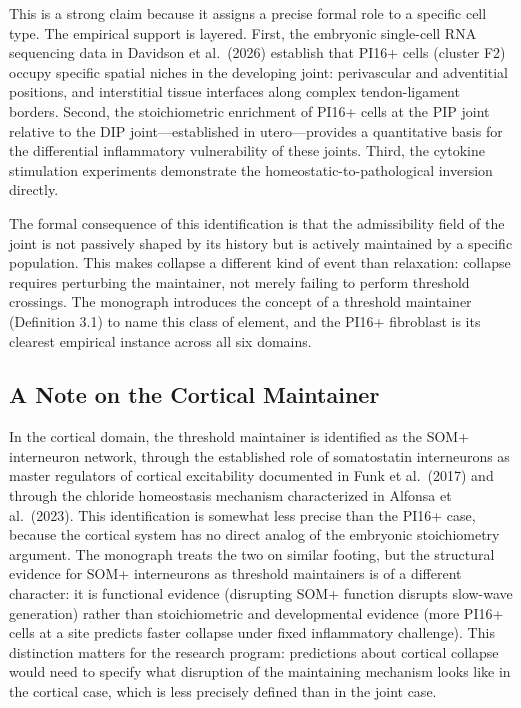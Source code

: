 \documentclass[12pt, a4paper]{article}
\theoremstyle{definition}
\begin{document}
This is a strong claim because it assigns a precise formal role to a specific cell type. The empirical support is layered. First, the embryonic single-cell RNA sequencing data in Davidson et al.\ (2026) establish that PI16+ cells (cluster F2) occupy specific spatial niches in the developing joint: perivascular and adventitial positions, and interstitial tissue interfaces along complex tendon-ligament borders. Second, the stoichiometric enrichment of PI16+ cells at the PIP joint relative to the DIP joint---established in utero---provides a quantitative basis for the differential inflammatory vulnerability of these joints. Third, the cytokine stimulation experiments demonstrate the homeostatic-to-pathological inversion directly.

The formal consequence of this identification is that the admissibility field of the joint is not passively shaped by its history but is actively maintained by a specific population. This makes collapse a different kind of event than relaxation: collapse requires perturbing the maintainer, not merely failing to perform threshold crossings. The monograph introduces the concept of a threshold maintainer (Definition 3.1) to name this class of element, and the PI16+ fibroblast is its clearest empirical instance across all six domains.

\subsection{A Note on the Cortical Maintainer}

In the cortical domain, the threshold maintainer is identified as the SOM+ interneuron network, through the established role of somatostatin interneurons as master regulators of cortical excitability documented in Funk et al.\ (2017) and through the chloride homeostasis mechanism characterized in Alfonsa et al.\ (2023). This identification is somewhat less precise than the PI16+ case, because the cortical system has no direct analog of the embryonic stoichiometry argument. The monograph treats the two on similar footing, but the structural evidence for SOM+ interneurons as threshold maintainers is of a different character: it is functional evidence (disrupting SOM+ function disrupts slow-wave generation) rather than stoichiometric and developmental evidence (more PI16+ cells at a site predicts faster collapse under fixed inflammatory challenge). This distinction matters for the research program: predictions about cortical collapse would need to specify what disruption of the maintaining mechanism looks like in the cortical case, which is less precisely defined than in the joint case.
\end{document}
